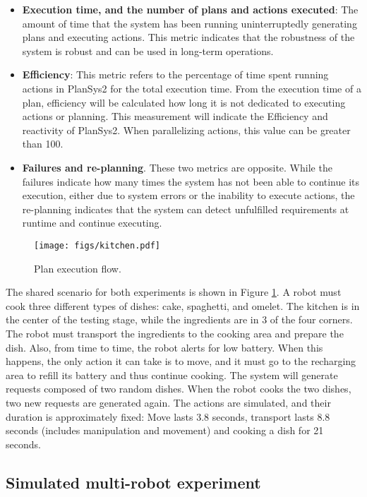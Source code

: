 \documentclass[letterpaper, 10 pt, conference]{IEEEtran}
\begin{document}
\begin{itemize}
    \item \textbf{Execution time, and the number of plans and actions executed}: The amount of time that the system has been running uninterruptedly generating plans and executing actions. This metric indicates that the robustness of the system is robust and can be used in long-term operations.
    \item \textbf{Efficiency}: This metric refers to the percentage of time spent running actions in PlanSys2 for the total execution time. From the execution time of a plan, efficiency will be calculated how long it is not dedicated to executing actions or planning. This measurement will indicate the Efficiency and reactivity of PlanSys2. When parallelizing actions, this value can be greater than 100.
    \item \textbf{Failures and re-planning}. These two metrics are opposite. While the failures indicate how many times the system has not been able to continue its execution, either due to system errors or the inability to execute actions, the re-planning indicates that the system can detect unfulfilled requirements at runtime and continue executing.
\end{itemize}

\begin{figure}[tb]
  \centering
  \texttt{[image: figs/kitchen.pdf]}
  \caption{Plan execution flow.}
  \label{fig:exp-setup}
\end{figure}

The shared scenario for both experiments is shown in Figure \ref{fig:exp-setup}. A robot must cook three different types of dishes: cake, spaghetti, and omelet. The kitchen is in the center of the testing stage, while the ingredients are in 3 of the four corners. The robot must transport the ingredients to the cooking area and prepare the dish. Also, from time to time, the robot alerts for low battery. When this happens, the only action it can take is to move, and it must go to the recharging area to refill its battery and thus continue cooking. The system will generate requests composed of two random dishes. When the robot cooks the two dishes, two new requests are generated again. The actions are simulated, and their duration is approximately fixed: Move lasts 3.8 seconds, transport lasts 8.8 seconds (includes manipulation and movement) and cooking a dish for 21 seconds.

\subsection{Simulated multi-robot experiment}
\label{sec:multi-robot}
\end{document}
